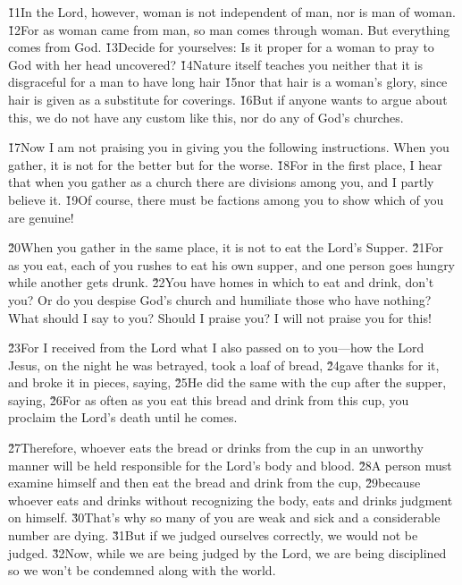\v{11}In the Lord, however, woman is not independent of man, nor is man of woman. \v{12}For as woman came from man, so man comes through woman. But everything comes from God. \v{13}Decide for yourselves: Is it proper for a woman to pray to God with her head uncovered? \v{14}Nature itself teaches you neither that it is disgraceful for a man to have long hair \v{15}nor that hair is a woman's glory, since hair is given as a substitute for coverings. \v{16}But if anyone wants to argue about this, we do not have any custom like this, nor do any of God's churches.

\v{17}Now I am not praising you in giving you the following instructions. When you gather, it is not for the better but for the worse. \v{18}For in the first place, I hear that when you gather as a church there are divisions among you, and I partly believe it. \v{19}Of course, there must be factions among you to show which of you are genuine!

\v{20}When you gather in the same place, it is not to eat the Lord's Supper. \v{21}For as you eat, each of you rushes to eat his own supper, and one person goes hungry while another gets drunk. \v{22}You have homes in which to eat and drink, don't you? Or do you despise God's church and humiliate those who have nothing? What should I say to you? Should I praise you? I will not praise you for this!

\v{23}For I received from the Lord what I also passed on to you---how the Lord Jesus, on the night he was betrayed, took a loaf of bread, \v{24}gave thanks for it, and broke it in pieces, saying,  \v{25}He did the same with the cup after the supper, saying,  \v{26}For as often as you eat this bread and drink from this cup, you proclaim the Lord's death until he comes.

\v{27}Therefore, whoever eats the bread or drinks from the cup in an unworthy manner will be held responsible for the Lord's body and blood. \v{28}A person must examine himself and then eat the bread and drink from the cup, \v{29}because whoever eats and drinks without recognizing the body, eats and drinks judgment on himself. \v{30}That's why so many of you are weak and sick and a considerable number are dying. \v{31}But if we judged ourselves correctly, we would not be judged. \v{32}Now, while we are being judged by the Lord, we are being disciplined so we won't be condemned along with the world.

